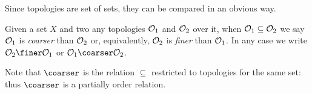 Since topologies are set of sets, they can be compared in an obvious way.

\begin{definition}
Given a set \(X\) and two any topologies \(\mathcal O_1\) and \(\mathcal O_2\) over it, when \(\mathcal O_1 \subseteq \mathcal O_2\) we say \(\mathcal O_1\) is {\em coarser} than \(\mathcal O_2\) or, equivalently, \(\mathcal O_2\) is {\em finer} than \(\mathcal O_1\). In any case we write \(\calO_2 \finer \calO_1\) or \(\calO_1 \coarser \calO_2\).
\end{definition}

Note that \(\coarser\) is the relation \(\subseteq\) restricted to topologies for the same set: thus \(\coarser\) is a partially order relation.